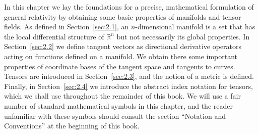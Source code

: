 
In this chapter we lay the foundations for a precise, mathematical formulation of
general relativity by obtaining some basic properties of manifolds and tensor fields.
As defined in Section~\ref{sec:2.1}, an \(n\)-dimensional manifold is a set that has
the local differential structure of \(\mathbb{R}^n\) but not necessarily its global
properties.  In Section~\ref{sec:2.2} we define tangent vectors as directional
derivative operators acting on functions defined on a manifold.  We obtain there
some important properties of coordinate bases of the tangent space and tangents to
curves.  Tensors are introduced in Section~\ref{sec:2.3}, and the notion of a
metric is defined.  Finally, in Section~\ref{sec:2.4} we introduce the abstract
index notation for tensors, which we shall use throughout the remainder of this
book.  We will use a fair number of standard mathematical symbols in this chapter,
and the reader unfamiliar with these symbols should consult the section ``Notation
and Conventions'' at the beginning of this book.
